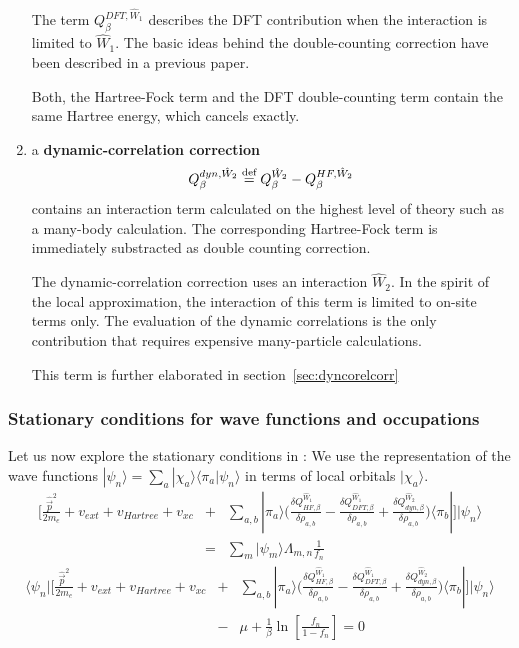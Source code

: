 \documentclass[11pt,a4paper]{report}
\begin{document}
\begin{enumerate}
  The term $Q^{DFT,\hat{W}_1}_\beta$ describes the DFT contribution
  when the interaction is limited to $\hat{W}_1$. The basic ideas
  behind the double-counting correction have been described in a
  previous paper\cite{bloechl11_prb84_205101}.

  Both, the Hartree-Fock term and the DFT double-counting term contain
  the same Hartree energy, which cancels exactly. 
%
\item a \textbf{dynamic-correlation
  correction}
  \begin{eqnarray}
  Q^{dyn,\hat{W}_2}_\beta\stackrel{\text{def}}{=} Q^{\hat{W}_2}_\beta-Q^{HF,\hat{W}_2}_\beta
  \end{eqnarray}
  contains an interaction term calculated on the highest level of
  theory such as a many-body calculation. The corresponding
  Hartree-Fock term is immediately substracted as double counting
  correction.

  The dynamic-correlation correction uses an interaction
  $\hat{W}_2$. In the spirit of the local approximation, the
  interaction of this term is limited to on-site terms only. The
  evaluation of the dynamic correlations is the only contribution that
  requires expensive many-particle calculations.

  This term is further elaborated in section~\ref{sec:dyncorelcorr}
\end{enumerate}


\subsubsection{Stationary conditions for wave functions and occupations}
Let us now explore the stationary conditions in : We use the
representation of the wave functions $|\psi_n\rangle=\sum_a
|\chi_a\rangle\langle\pi_a|\psi_n\rangle$ in terms of local orbitals
$|\chi_a\rangle$.
\begin{eqnarray}
\biggl[\frac{\hat{\vec{p}}^2}{2m_e}+v_{ext}+v_{Hartree}+v_{xc}
&
+&\sum_{a,b}|\pi_a\rangle\biggl(
\frac{\delta Q^{\hat{W}_1}_{HF,\beta}}{\delta\rho_{a,b}}
-\frac{\delta Q^{\hat{W}_1}_{DFT,\beta}}{\delta\rho_{a,b}}
+\frac{\delta Q^{\hat{W}_2}_{dyn,\beta}}{\delta\rho_{a,b}}
\biggr)\langle\pi_b|
\biggr]|\psi_n\rangle
\nonumber\\
&=&\sum_{m}|\psi_m\rangle\Lambda_{m,n}\frac{1}{f_n}
\end{eqnarray}
\begin{eqnarray}
\langle\psi_n|
\biggl[
\frac{\hat{\vec{p}}^2}{2m_e}+v_{ext}+v_{Hartree}+v_{xc}
&+&\sum_{a,b}|\pi_a\rangle\biggl(
\frac{\delta Q^{\hat{W}_1}_{HF,\beta}}{\delta\rho_{a,b}}
-\frac{\delta Q^{\hat{W}_1}_{DFT,\beta}}{\delta\rho_{a,b}}
+\frac{\delta Q^{\hat{W}_2}_{dyn,\beta}}{\delta\rho_{a,b}}
\biggr)\langle\pi_b|
\biggr]|\psi_n\rangle
\nonumber\\
&-&\mu+\frac{1}{\beta}\ln\left[\frac{f_n}{1-f_n}\right]=0
\end{eqnarray}
\end{document}
